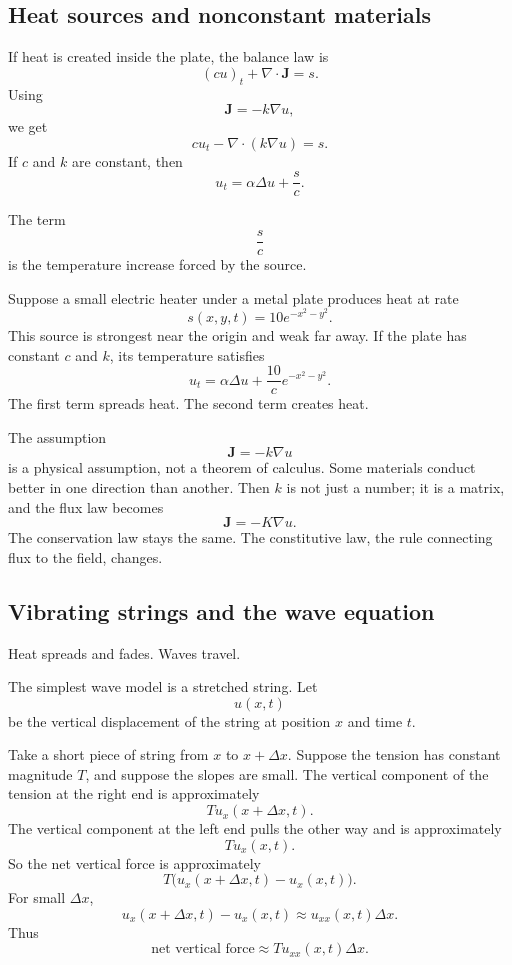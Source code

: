 \subsection{Heat sources and nonconstant materials}

If heat is created inside the plate, the balance law is
\[
    (cu)_t+\nabla\cdot\mathbf J=s.
\]
Using
\[
    \mathbf J=-k\nabla u,
\]
we get
\[
\boxed{
    c u_t-\nabla\cdot(k\nabla u)=s.
}
\]
If \(c\) and \(k\) are constant, then
\[
\boxed{
    u_t=\alpha\Delta u+\frac{s}{c}.
}
\]

The term
\[
    \frac{s}{c}
\]
is the temperature increase forced by the source.

\begin{example}
Suppose a small electric heater under a metal plate produces heat at rate
\[
    s(x,y,t)=10e^{-x^2-y^2}.
\]
This source is strongest near the origin and weak far away.  If the plate has constant
\(c\) and \(k\), its temperature satisfies
\[
    u_t=\alpha\Delta u+\frac{10}{c}e^{-x^2-y^2}.
\]
The first term spreads heat.  The second term creates heat.
\end{example}

The assumption
\[
    \mathbf J=-k\nabla u
\]
is a physical assumption, not a theorem of calculus.  Some materials conduct better in
one direction than another.  Then \(k\) is not just a number; it is a matrix, and the flux
law becomes
\[
    \mathbf J=-K\nabla u.
\]
The conservation law stays the same.  The constitutive law, the rule connecting flux to
the field, changes.

\subsection{Vibrating strings and the wave equation}

Heat spreads and fades.  Waves travel.

The simplest wave model is a stretched string.  Let
\[
    u(x,t)
\]
be the vertical displacement of the string at position \(x\) and time \(t\).

Take a short piece of string from \(x\) to \(x+\Delta x\).  Suppose the tension has
constant magnitude \(T\), and suppose the slopes are small.  The vertical component of
the tension at the right end is approximately
\[
    T u_x(x+\Delta x,t).
\]
The vertical component at the left end pulls the other way and is approximately
\[
    T u_x(x,t).
\]
So the net vertical force is approximately
\[
    T\bigl(u_x(x+\Delta x,t)-u_x(x,t)\bigr).
\]
For small \(\Delta x\),
\[
    u_x(x+\Delta x,t)-u_x(x,t)\approx u_{xx}(x,t)\Delta x.
\]
Thus
\[
    \text{net vertical force}\approx T u_{xx}(x,t)\Delta x.
\]

